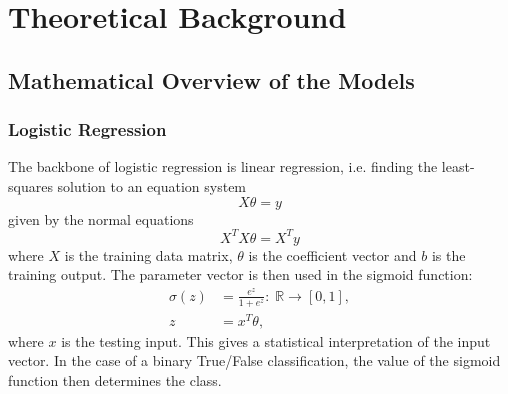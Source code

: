 \section{Theoretical Background}


\subsection{Mathematical Overview of the Models}
\subsubsection{Logistic Regression}
The backbone of logistic regression is linear regression, i.e. finding the least-squares solution to an equation system \begin{equation}
    X\theta = y
\end{equation}
given by the normal equations \begin{equation}
    X^TX \theta = X^Ty
\end{equation}
where $X$ is the training data matrix, $\theta$ is the coefficient vector and $b$ is the training output. The parameter vector is then used in the sigmoid function: \begin{align}
    \sigma(z) &= \frac{e^{z}}{1+e^{z}}: \; \mathbb{R}\to [0,1],\\
    z &= x^T \theta,
\end{align}
where $x$ is the testing input. This gives a statistical interpretation of the input vector. In the case of a binary True/False classification, the value of the sigmoid function then determines the class.

